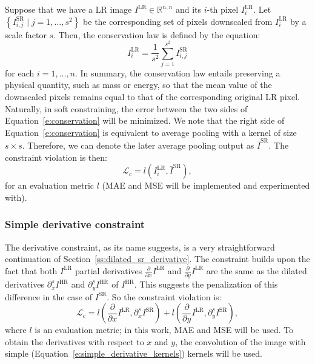Suppose that we have a LR image $I^\text{LR} \in \mathbb{R}^{n,n}$ and its $i$-th pixel $I^\text{LR}_i$.
Let $\left\{I^\text{SR}_{i, j} \mid j=1,\dots,s^2\right\}$ be the corresponding set of pixels downscaled from $I^\text{LR}_i$ by a scale factor $s$.
Then, the conservation law is defined by the equation:
\begin{equation}
    I^\text{LR}_i = \frac{1}{s^2}\sum_{j=1}^{s^2}I^\text{SR}_{i, j}
    \label{e:conservation}
\end{equation}
for each $i = 1, \dots, n$. 
In summary, the conservation law entails preserving a physical quantity, such as mass or energy, so that the mean value of the downscaled pixels remains equal to that of the corresponding original LR pixel.
Naturally, in soft constraining, the error between the two sides of Equation~\eqref{e:conservation} will be minimized.
We note that the right side of Equation~\eqref{e:conservation} is equivalent to average pooling with a kernel of size $s \times s$.
Therefore, we can denote the later average pooling output as $\bar{I}^\text{SR}$. 
The constraint violation is then:
\begin{equation}
    \mathcal{L}_c = l\left(I^\text{LR}_i, \bar{I}^\text{SR}\right),
\end{equation}
for an evaluation metric $l$ (MAE and MSE will be implemented and experimented with).

\subsubsection{Simple derivative constraint}

The derivative constraint, as its name suggests, is a very straightforward continuation of Section~\ref{ss:dilated_sr_derivative}.
The constraint builds upon the fact that both $I^\text{LR}$ partial derivatives $\frac{\partial}{\partial x}I^\text{LR}$ and $\frac{\partial}{\partial y}I^\text{LR}$ are the same as the dilated derivatives $\partial_x^sI^\text{HR}$ and $\partial_y^sI^\text{HR}$ of $I^\text{HR}$.
This suggests the penalization of this difference in the case of  $I^\text{SR}$.
So the constraint violation is:
\begin{equation}
    \mathcal{L}_c = l\left(\frac{\partial}{\partial x} I^\text{LR}, \partial^s_x I^\text{SR}\right) + l\left(\frac{\partial}{\partial y} I^\text{LR}, \partial^s_y I^\text{SR}\right),
\end{equation}
where $l$ is an evaluation metric; in this work, MAE and MSE will be used.
To obtain the derivatives with respect to $x$ and $y$, the convolution of the image with simple (Equation~\eqref{e:simple_derivative_kernels}) kernels will be used.

